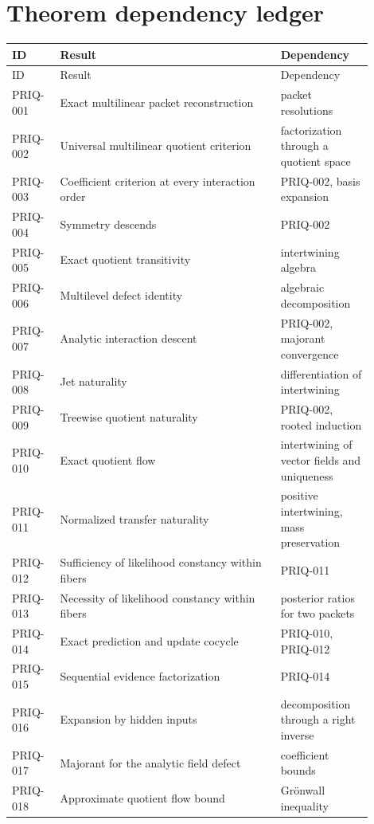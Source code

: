 \documentclass[11pt,oneside,openany]{book}
\numberwithin{equation}{section}
\begin{document}
\section{Theorem dependency ledger}\label{PRIQ:app:ledger}

\begin{longtable}{@{}p{0.12\linewidth}p{0.55\linewidth}p{0.23\linewidth}@{}}
\toprule
ID & Result & Dependency\\
\midrule
\endfirsthead
\toprule
ID & Result & Dependency\\
\midrule
\endhead
PRIQ-001 & Exact multilinear packet reconstruction & packet resolutions\\
PRIQ-002 & Universal multilinear quotient criterion & factorization through a quotient space\\
PRIQ-003 & Coefficient criterion at every interaction order & PRIQ-002, basis expansion\\
PRIQ-004 & Symmetry descends & PRIQ-002\\
PRIQ-005 & Exact quotient transitivity & intertwining algebra\\
PRIQ-006 & Multilevel defect identity & algebraic decomposition\\
PRIQ-007 & Analytic interaction descent & PRIQ-002, majorant convergence\\
PRIQ-008 & Jet naturality & differentiation of intertwining\\
PRIQ-009 & Treewise quotient naturality & PRIQ-002, rooted induction\\
PRIQ-010 & Exact quotient flow & intertwining of vector fields and uniqueness\\
PRIQ-011 & Normalized transfer naturality & positive intertwining, mass preservation\\
PRIQ-012 & Sufficiency of likelihood constancy within fibers & PRIQ-011\\
PRIQ-013 & Necessity of likelihood constancy within fibers & posterior ratios for two packets\\
PRIQ-014 & Exact prediction and update cocycle & PRIQ-010, PRIQ-012\\
PRIQ-015 & Sequential evidence factorization & PRIQ-014\\
PRIQ-016 & Expansion by hidden inputs & decomposition through a right inverse\\
PRIQ-017 & Majorant for the analytic field defect & coefficient bounds\\
PRIQ-018 & Approximate quotient flow bound & Grönwall inequality\\

\end{longtable}
\end{document}
